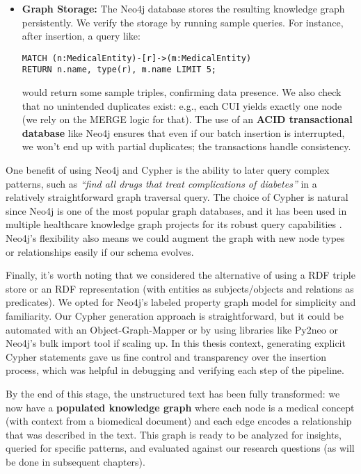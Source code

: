 \begin{itemize}
\item \textbf{Graph Storage:} The Neo4j database stores the resulting knowledge graph persistently. We verify the storage by running sample queries. For instance, after insertion, a query like:

\begin{verbatim}
MATCH (n:MedicalEntity)-[r]->(m:MedicalEntity) 
RETURN n.name, type(r), m.name LIMIT 5;
\end{verbatim}

  would return some sample triples, confirming data presence. We also check that no unintended duplicates exist: e.g., each CUI yields exactly one node (we rely on the MERGE logic for that). The use of an \textbf{ACID transactional database} like Neo4j ensures that even if our batch insertion is interrupted, we won't end up with partial duplicates; the transactions handle consistency.
\end{itemize}

One benefit of using Neo4j and Cypher is the ability to later query complex patterns, such as \textit{``find all drugs that treat complications of diabetes''} in a relatively straightforward graph traversal query. The choice of Cypher is natural since Neo4j is one of the most popular graph databases, and it has been used in multiple healthcare knowledge graph projects for its robust query capabilities \parencite{Neo4j2023}. Neo4j's flexibility also means we could augment the graph with new node types or relationships easily if our schema evolves.

Finally, it's worth noting that we considered the alternative of using a RDF triple store or an RDF representation (with entities as subjects/objects and relations as predicates). We opted for Neo4j's labeled property graph model for simplicity and familiarity. Our Cypher generation approach is straightforward, but it could be automated with an Object-Graph-Mapper or by using libraries like Py2neo or Neo4j's bulk import tool if scaling up. In this thesis context, generating explicit Cypher statements gave us fine control and transparency over the insertion process, which was helpful in debugging and verifying each step of the pipeline.

By the end of this stage, the unstructured text has been fully transformed: we now have a \textbf{populated knowledge graph} where each node is a medical concept (with context from a biomedical document) and each edge encodes a relationship that was described in the text. This graph is ready to be analyzed for insights, queried for specific patterns, and evaluated against our research questions (as will be done in subsequent chapters).

